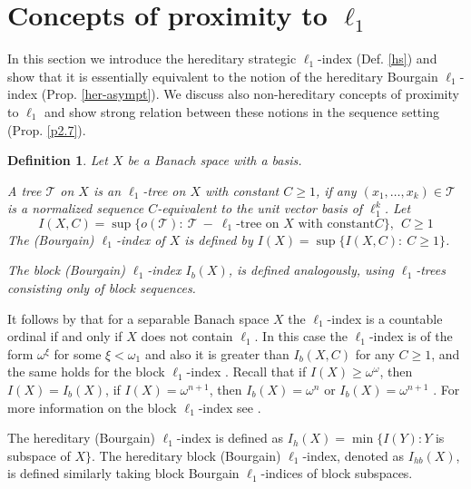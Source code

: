 \documentclass[a4paper]{amsart}
\theoremstyle{plain}
\newtheorem{definition}[theorem]{Definition}
\newcommand{\mc}{\mathcal}
\begin{document}
\section{Concepts of proximity to $\ell_{1}$}\label{sec3}
In this section we introduce the hereditary strategic $\ell_{1}$-index (Def. \ref{hs}) and
show that it is essentially equivalent to the notion of the hereditary Bourgain
$\ell_{1}$-index (Prop. \ref{her-asympt}). We discuss also non-hereditary concepts of
proximity to $\ell_{1}$ and show strong relation between these notions in the sequence
setting (Prop. \ref{p2.7}).

\begin{definition}
Let $X$ be a Banach space with a basis.

A tree $ \mc{T}$ on $X$ is an $\ell_{1}$-\textit{tree on} $X$ with constant $C\geq 1$, if any
$(x_1,\dots,x_k)\in  \mc{T}$ is a normalized sequence $C$-equivalent to the unit vector basis
of $\ell_{1}^k$. Let
$$
I(X,C)=\sup\{o( \mc{T}):\  \mc{T} \ -\ \ell_{1}\text{-tree on } X \text{ with constant
}C\}, \ \ C\geq 1
$$
The (\textit{Bourgain) $\ell_{1}$-index of $X$} is defined by $I(X)=\sup\{I(X,C):\ C\geq
1\}$.

The \textit{block (Bourgain)} $\ell_{1}$-index $I_b(X)$, is defined
analogously, using $\ell_{1}$-trees consisting only of block
sequences.
\end{definition}
It follows by  \cite{B} that for a separable Banach space $X$ the $\ell_{1}$-index is a
countable ordinal if and only if $X$ does not contain $\ell_{1}$. In this case the
$\ell_{1}$-index is of the form $\omega^{\xi}$ for some $\xi<\omega_{1}$ and also it is
greater than $I_b(X,C)$ for any $C\geq 1$, and the same holds for the block
$\ell_{1}$-index \cite{JO}. Recall that if $I(X)\geq \omega^\omega$, then $I(X)=I_b(X)$,
if $I(X)=\omega^{n+1}$, then $I_b(X)=\omega^n$ or $I_b(X)=\omega^{n+1}$ \cite{JO}. For
more information on the block $\ell_{1}$-index see \cite{JO}.

The hereditary (Bourgain) $\ell_{1}$-index is defined as
$I_{h}(X)=\min\{I(Y): Y$ is  subspace of $X\}$. The
hereditary block (Bourgain) $\ell_{1}$-index, denoted as
$I_{hb}(X)$, is defined similarly taking block Bourgain $\ell_{1}$-indices of block subspaces.
\end{document}
